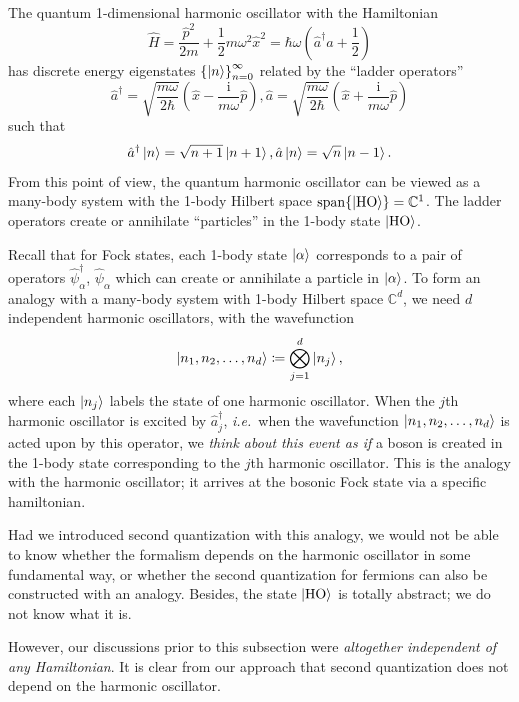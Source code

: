 \documentclass{article}
\theoremstyle{definition}
\numberwithin{equation}{section}
\begin{document}
The quantum 1-dimensional harmonic oscillator 
with the Hamiltonian 
\[
    \hat{H}
    =
    \frac{\hat{p}^{2}}{2m}
    +
    \frac{1}{2}
    m \omega ^{2} 
    \hat{x}^{2}
    =
    \hbar \omega 
    \left( \hat{a}^{\dagger} \hat{a}+\frac{1}{2} \right) 
\]
has discrete energy eigenstates 
$\left\{ \ket{n} \right\}_{n=0}^{\infty}$
related 
by the ``ladder operators'' 
\[
    \hat{a}^{\dagger}
    =
    \sqrt{\frac{m \omega}{2 \hbar}}
    \left( 
        \hat{x}
        -
        \frac{\mathrm{i}}{m \omega} 
        \hat{p}
     \right), 
    \hat{a} 
    =
    \sqrt{\frac{m \omega}{2 \hbar}}
    \left( 
        \hat{x}
        +
        \frac{\mathrm{i}}{m \omega} 
        \hat{p}
     \right)
\]
such that 
\[
    \hat{a}^{\dagger} \ket{n} = \sqrt{n+1} \ket{n+1},
    \hat{a} \ket{n} = \sqrt{n} \ket{n-1}.
\]
From this point of view, 
the quantum harmonic oscillator 
can be viewed as a many-body system 
with the 1-body Hilbert space 
$\operatorname{span}\{\ket{\text{HO}}\}
=
\mathbb{C}^{1}$. 
The ladder operators create or annihilate 
``particles'' in the 1-body state 
$\ket{\text{HO}}$. 

Recall that for Fock states, 
each 1-body state $\ket{\alpha}$ 
corresponds to 
a pair of operators 
$\hat{\psi}^{\dagger}_{\alpha}$, 
$\hat{\psi}_{\alpha}$ which 
can create or annihilate a particle in $\ket{\alpha}$. 
To form an analogy with 
a many-body system with 1-body Hilbert space 
$\mathbb{C}^{d}$, 
we need $d$ independent harmonic oscillators, 
with the wavefunction
\[
    \ket{n_1,n_2, \ldots ,n_d}
    \coloneqq
    \bigotimes _{j=1}^{d}\ket{n_{j}},
\]
where each $\ket{n_{j}}$ labels the state of one 
harmonic oscillator. 
When the $j$th harmonic oscillator 
is excited by $\hat{a}^{\dagger}_{j}$, 
\textit{i.e.}\ when the wavefunction 
$\ket{n_1,n_2, \ldots ,n_d}$ 
is acted upon 
by this operator, 
we \emph{think about this event as if} 
a boson is created in the 1-body state 
corresponding to the $j$th harmonic oscillator. 
This is the analogy with the harmonic oscillator; 
it arrives at the bosonic Fock state 
via a specific hamiltonian. 

Had we introduced second quantization 
with this analogy, we would not be able to know 
whether the formalism depends on 
the harmonic oscillator in some fundamental way, 
or whether the second quantization for fermions 
can also be constructed with an analogy. 
Besides, the state $\ket{\text{HO}}$ is 
totally abstract; we do not know what it is. 

However, our discussions prior to this subsection 
were \emph{altogether independent of any Hamiltonian}. 
It is clear from our approach that second quantization 
does not depend on the harmonic oscillator.
\end{document}
